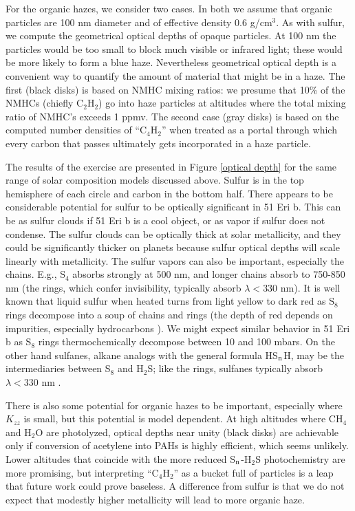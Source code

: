 \documentclass[preprint]{aastex6}
\begin{document}
For the organic hazes, we consider two cases.
In both we assume that organic particles are 100 nm diameter and of effective density 0.6 g/cm$^3$. 
{\color{red} As with sulfur, we compute the geometrical optical depths of opaque particles.
At 100 nm the particles would be too small to block much visible or infrared light; these would be more likely
to form a blue haze.
Nevertheless geometrical optical depth is a convenient way to quantify the amount of material that might be in a haze. } 
The first (black disks) is based on NMHC mixing ratios:
we presume that 10\% of the NMHCs (chiefly C$_2$H$_2$) go into haze particles at altitudes where
the total mixing ratio of NMHC's exceeds 1 ppmv.
The second case (gray disks) is based on the computed number densities
of ``C$_4$H$_2$'' when treated as a portal through which every carbon that
passes ultimately gets incorporated in a haze particle. 

The results of the exercise are presented in Figure \ref{optical depth} for the same range of 
solar composition models discussed above. 
Sulfur is in the top hemisphere of each circle and carbon in the bottom half.
There appears to be considerable potential for sulfur to be optically significant in 51 Eri b.
This can be as sulfur clouds if 51 Eri b is a cool object, or as vapor  
if sulfur does not condense.  
The sulfur clouds can be optically thick at solar metallicity, and they could be significantly thicker on planets
 because sulfur optical depths will scale linearly with metallicity. 
The sulfur vapors can also be important, especially the chains.
E.g., S$_4$ absorbs strongly at 500 nm, and longer chains absorb 
 to 750-850 nm \citep{Meyer1976} (the rings, which confer invisibility, typically absorb $\lambda < 330$ nm).
 It is well known that liquid sulfur when heated turns from light yellow to dark red as S$_8$ rings
  decompose into a soup of chains and rings (the depth of red depends on impurities, especially hydrocarbons \citep{Moses1991}).   
 We might expect similar behavior in 51 Eri b as S$_8$ rings thermochemically decompose between 10 and 100 mbars.
 On the other hand sulfanes, alkane analogs with the general formula HS$_{\rm n}$H, may be the
 intermediaries between S$_8$ and H$_2$S; like the rings, sulfanes typically absorb $\lambda < 330$ nm \citep{Meyer1976}.
 
There is also some potential for organic hazes to be important, especially where $K_{zz}$ is small,
but this potential is model dependent.
At high altitudes where CH$_4$ and H$_2$O are photolyzed,
optical depths near unity (black disks) are achievable only if conversion of acetylene into PAHs is highly efficient,
which seems unlikely.  
Lower altitudes that coincide with the more reduced S$_{\rm n}$-H$_2$S photochemistry are more promising,
but interpreting ``C$_4$H$_2$'' as a bucket full of particles is a leap that future work could prove baseless.
A difference from sulfur is that we do not expect that modestly higher metallicity will lead to more organic haze. 
   
\end{document}
